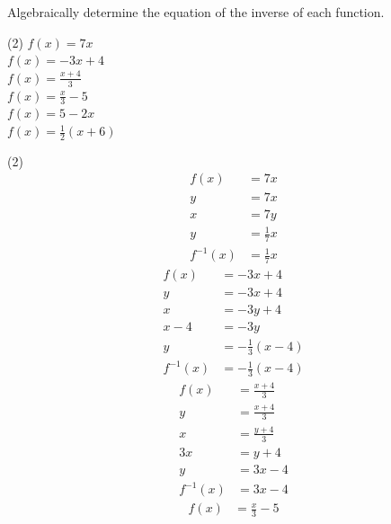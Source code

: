 \documentclass[12pt,fleqn]{book}
\newcommand{\prb}[1]{\begin{Exercise}#1\end{Exercise}}
\newcommand{\sol}[1]{\begin{Answer}#1\end{Answer}}
\begin{document}
\prb{
    Algebraically determine the equation of the inverse of each function.
    \begin{tasks}(2)
        \task $f(x)=7 x$
        \\[2.5in]
        \task $f(x)=-3 x+4$
        \\[2in]
        \task $f(x)=\frac{x+4}{3}$
        \\[2.5in]
        \task $f(x)=\frac{x}{3}-5$
        \\[2in]
        \task $f(x)=5-2 x$
        \\[2.5in]
        \task $f(x)=\frac{1}{2}(x+6)$
        \\[2in]
    \end{tasks}
}
\sol{
    \begin{tasks}(2)
        \task
        \begin{align*}
            f(x)      & =7 x           \\
            y         & =7 x           \\
            x         & =7 y           \\
            y         & =\frac{1}{7} x \\
            f^{-1}(x) & =\frac{1}{7} x
        \end{align*}
        \task
        \begin{align*}
            f(x)      & =-3 x+4            \\
            y         & =-3 x+4            \\
            x         & =-3 y+4            \\
            x-4       & =-3 y              \\
            y         & =-\frac{1}{3}(x-4) \\
            f^{-1}(x) & =-\frac{1}{3}(x-4)
        \end{align*}
        \task
        \begin{align*}
            f(x)      & =\frac{x+4}{3} \\
            y         & =\frac{x+4}{3} \\
            x         & =\frac{y+4}{3} \\
            3 x       & =y+4           \\
            y         & =3 x-4         \\
            f^{-1}(x) & =3 x-4
        \end{align*}
        \task
        \begin{align*}
            f(x)      & =\frac{x}{3}-5 \\

\end{align*}
\end{tasks}}
\end{document}
